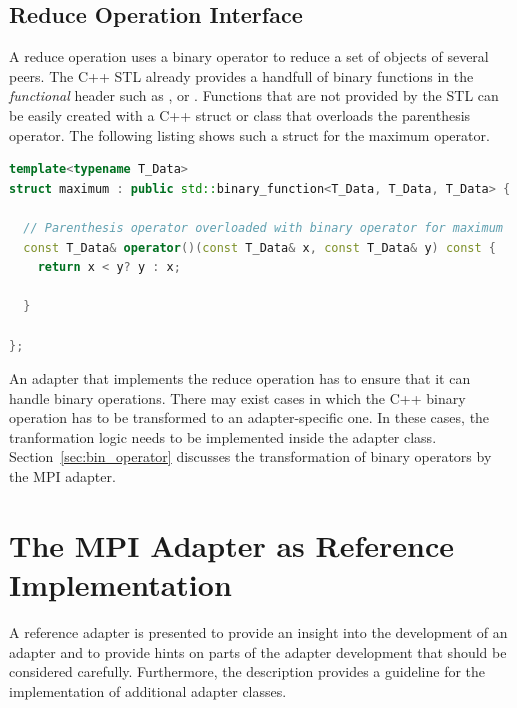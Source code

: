 \subsection{Reduce Operation Interface}
A reduce operation uses a binary operator to reduce a set of objects
of several peers. The C++ STL already provides a handfull of binary
functions in the \emph{functional} header such as ,
 or 
\cite{ref:functional}. Functions that are not provided by the STL can
be easily created with a C++ struct or class that overloads the
parenthesis operator. The following listing shows such a struct for
the maximum operator.

\begin{lstlisting}[language=C++, breaklines=false, label={lst:binary_function}]
template<typename T_Data>
struct maximum : public std::binary_function<T_Data, T_Data, T_Data> {

  // Parenthesis operator overloaded with binary operator for maximum
  const T_Data& operator()(const T_Data& x, const T_Data& y) const {
    return x < y? y : x;

  }

};
\end{lstlisting}

\noindent An adapter that implements the reduce operation has to
ensure that it can handle binary operations.  There may exist cases in
which the C++ binary operation has to be transformed to an
adapter-specific one.  In these cases, the tranformation logic needs
to be implemented inside the adapter class.
Section~\ref{sec:bin_operator} discusses the transformation of binary
operators by the MPI adapter.

\section{The MPI Adapter as Reference Implementation}
\label{sec:cal_mpi_adapter}

A reference adapter is presented to provide an insight into the
development of an adapter and to provide hints on parts of the adapter
development that should be considered carefully. Furthermore, the
description provides a guideline for the implementation of additional
adapter classes.

